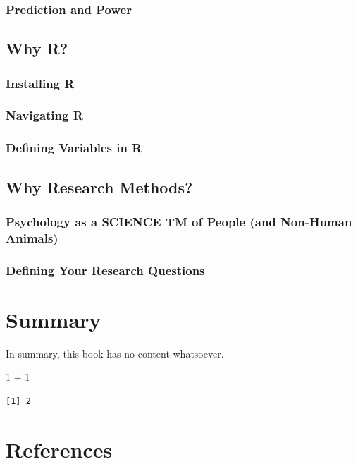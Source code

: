 \documentclass[
  letterpaper,
  DIV=11,
  numbers=noendperiod]{scrreprt}
\newenvironment{Shaded}{\begin{snugshade}}{\end{snugshade}}
\newcommand{\DecValTok}[1]{\textcolor[rgb]{0.68,0.00,0.00}{#1}}
\newcommand{\SpecialCharTok}[1]{\textcolor[rgb]{0.37,0.37,0.37}{#1}}
\newlength{\cslhangindent}
\newenvironment{CSLReferences}[2] %
 {\begin{list}{}{%
  \setlength{\itemindent}{0pt}
  \setlength{\leftmargin}{0pt}
  \setlength{\parsep}{0pt}
  \ifodd #1
   \setlength{\leftmargin}{\cslhangindent}
   \setlength{\itemindent}{-1\cslhangindent}
  \fi
  \setlength{\itemsep}{#2\baselineskip}}}
 {\end{list}}
\begin{document}
\subsection{Prediction and Power}\label{prediction-and-power}

\section{Why R?}\label{why-r}

\subsection{Installing R}\label{installing-r}

\subsection{Navigating R}\label{navigating-r}

\subsection{Defining Variables in R}\label{defining-variables-in-r}

\section{Why Research Methods?}\label{why-research-methods}

\subsection{Psychology as a SCIENCE TM of People (and Non-Human
Animals)}\label{psychology-as-a-science-tm-of-people-and-non-human-animals}

\subsection{Defining Your Research
Questions}\label{defining-your-research-questions}


\chapter{Summary}\label{summary}

In summary, this book has no content whatsoever.

\begin{Shaded}
\begin{Highlighting}[]
\DecValTok{1} \SpecialCharTok{+} \DecValTok{1}
\end{Highlighting}
\end{Shaded}

\begin{verbatim}
[1] 2
\end{verbatim}


\chapter*{References}\label{references}


\label{refs}
\begin{CSLReferences}{0}{1}
\end{CSLReferences}
\end{document}

